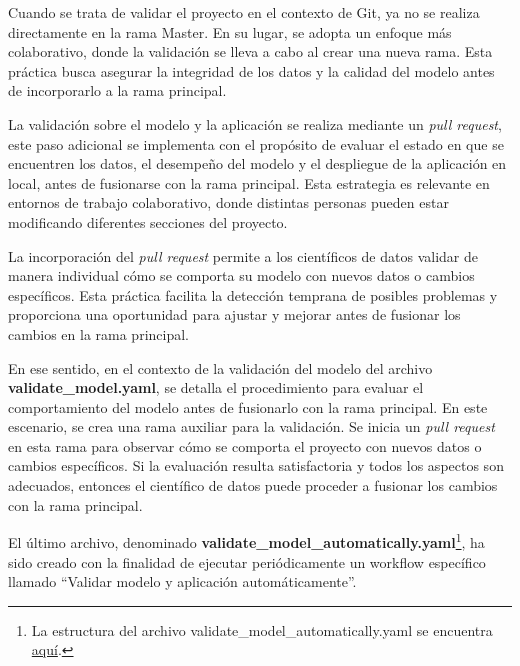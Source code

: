 Cuando se trata de validar el proyecto en el contexto de Git, ya no se realiza directamente en la rama Master. En su lugar, se adopta un enfoque más colaborativo, donde la validación se lleva a cabo al crear una nueva rama. Esta práctica busca asegurar la integridad de los datos y la calidad del modelo antes de incorporarlo a la rama principal. \newline

La validación sobre el modelo y la aplicación se realiza mediante un \textit{pull request}, este paso adicional se implementa con el propósito de evaluar el estado en que se encuentren los datos, el desempeño del modelo y el despliegue de la aplicación en local, antes de fusionarse con la rama principal. Esta estrategia es relevante en entornos de trabajo colaborativo, donde distintas personas pueden estar modificando diferentes secciones del proyecto. \newline

La incorporación del \textit{pull request} permite a los científicos de datos validar de manera individual cómo se comporta su modelo con nuevos datos o cambios específicos. Esta práctica facilita la detección temprana de posibles problemas y proporciona una oportunidad para ajustar y mejorar antes de fusionar los cambios en la rama principal. \newline

En ese sentido, en el contexto de la validación del modelo del archivo \textbf{validate\_model.yaml}, se detalla el procedimiento para evaluar el comportamiento del modelo antes de fusionarlo con la rama principal. En este escenario, se crea una rama auxiliar para la validación. Se inicia un \textit{pull request} en esta rama para observar cómo se comporta el proyecto con nuevos datos o cambios específicos. Si la evaluación resulta satisfactoria y todos los aspectos son adecuados, entonces el científico de datos puede proceder a fusionar los cambios con la rama principal. 

\newpage

El último archivo, denominado \textbf{validate\_model\_automatically.yaml}\footnote{La estructura del archivo  validate\_model\_automatically.yaml se encuentra \href{https://github.com/juferoto/mlops_project/blob/master/.github/workflows/validate_model_automatically.yaml}{aquí}.}, ha sido creado con la finalidad de ejecutar periódicamente un workflow específico llamado ``Validar modelo y aplicación automáticamente''. \newline

